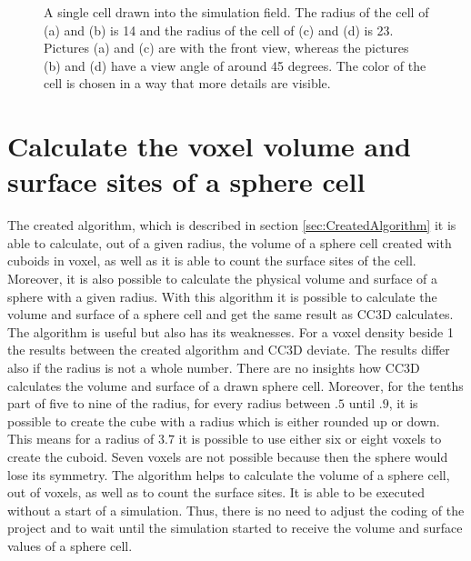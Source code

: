 \begin{figure}[ht]
\begin{center}
{	}
	\end{center}
	\caption[Drawn sphere cells with a radius of 14 and 23]{\label{img:DrawnSphereCellRadius14And23}A single cell drawn into the simulation field. The radius of the cell of (a) and (b) is 14 and the radius of the cell of (c) and (d) is 23. Pictures (a) and (c) are with the front view, whereas the
pictures (b) and (d) have a view angle of around 45 degrees. The color of the cell is chosen in
a way that more details are visible.}
\end{figure}


\section{Calculate the voxel volume and surface sites of a sphere cell}
The created algorithm, which is described in section \ref{sec:CreatedAlgorithm} it is able to calculate, out of a given radius, the volume of a sphere cell created with cuboids in voxel, as well as it is able to count the surface sites of the cell. Moreover, it is also possible to calculate the physical volume and surface of a sphere with a given radius. With this algorithm it is possible to calculate the volume and surface of a sphere cell and get the same result as \ac{CC3D} calculates. \newline
The algorithm is useful but also has its weaknesses. For a voxel density beside 1 the results between the created algorithm and \ac{CC3D} deviate. The results differ also if the radius is not a whole number. There are no insights how \ac{CC3D} calculates the volume and surface of a drawn sphere cell. Moreover, for the tenths part of five to nine of the radius, for every radius between $.5$ until $.9$, it is possible to create the cube with a radius which is either rounded up or down. This means for a radius of $3.7$ it is possible to use either six or eight voxels to create the cuboid. Seven voxels are not possible because then the sphere would lose its symmetry. \newline
The algorithm helps to calculate the volume of a sphere cell, out of voxels, as well as to count the surface sites. It is able to be executed without a start of a simulation. Thus, there is no need to adjust the coding of the project and to wait until the simulation started to receive the volume and surface values of a sphere cell.


